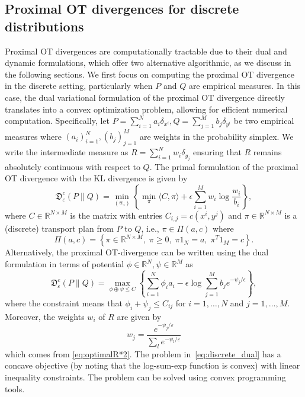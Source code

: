 \documentclass{amsart}
\newcommand{\BZ}[1]{\textcolor{olive}{BZ: #1}}
\newcommand{\R}{\mathbb{R}}
\theoremstyle{definition}
\theoremstyle{remark}
\numberwithin{equation}{section}
\begin{document}

\subsection{Proximal OT divergences for discrete distributions}
\label{sec:algorithms.discrete}
Proximal OT divergences are computationally tractable due to their dual and dynamic formulations, which offer two alternative algorithmic, as we discuss in the following sections. We first focus on computing the proximal OT divergence in the discrete setting, particularly when $P$ and $Q$ are empirical measures. In this case, the dual variational formulation of the proximal OT divergence directly translates into a convex optimization problem, allowing for efficient numerical computation. Specifically, let $P = \sum_{i=1}^N a_i \delta_{x^i},Q = \sum_{j=1}^M b_j \delta_{y^i}$ be two empirical measures where $(a_i)_{i=1}^N,(b_j)_{j=1}^M$ are weights in the probability simplex.  We write the intermediate measure as $R = \sum_{i=1}^N w_i\delta_{y_j}$  ensuring that $R$ remains absolutely continuous with respect to $Q$. The primal formulation of the proximal OT divergence with the KL divergence is given by 
\begin{equation}\label{eq:discrete_primal}
    \mathfrak{D}^{c}_{\varepsilon}(P\|Q) = \min_{(w_i)} \left\{\min_{\pi} \langle C,  \pi \rangle + \epsilon \sum_{i=1}^{M} w_i \log \frac{w_i}{b_i} \right\},
\end{equation}
where $C\in \R^{N \times M}$ is the matrix with entries $C_{i,j}=c(x^i,y^j)$ and $\pi \in \R^{N \times M}$ is a (discrete) transport plan from $P$ to $Q$, i.e.,  $\pi \in \Pi(a,c)$ where
\begin{equation}
\Pi(a,c) = \left\{\pi \in \R^{N \times M}, \; \pi \geq 0, \; \pi 1_N = a, \; \pi^T 1_M = c \right\}.
\end{equation}
Alternatively, the proximal OT-divergence can be written using the dual formulation in terms of potential $\phi \in \R^N, \psi\in \R^M$ as 
\begin{equation} \label{eq:discrete_dual}
    \mathfrak{D}^{c}_{\varepsilon}(P\|Q) = \max_{\phi\oplus\psi \le C} \left\{\sum_{i=1}^N \phi_i a_i - \epsilon \log \sum_{j=1}^M b_j e^{-\psi_j/\epsilon} \right\},
\end{equation}
where the constraint means that $\phi_i + \psi_j \leq C_{ij}$ for $i=1,\dots,N$ and $j = 1,\dots,M$. Moreover, the weights $w_i$ of $R$ are given by 
\begin{equation}
w_j = \frac{e^{-\psi_j/\varepsilon}}{\sum_{l}e^{-\psi_l/\varepsilon}}
\end{equation}
which comes from \eqref{eq:optimalR*2}. The problem in~\eqref{eq:discrete_dual} has a concave objective (by noting that the log-sum-exp function is convex) with linear inequality constraints. The problem can be solved using convex programming tools. 
\end{document}
